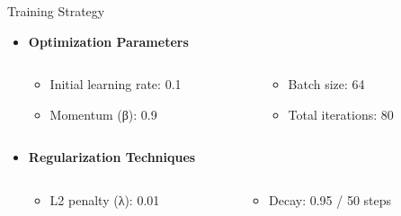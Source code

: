 \documentclass{beamer}
\begin{document}
\begin{frame}{Training Strategy}
    \begin{itemize}
        \item \textbf{Optimization Parameters}
            \begin{minipage}{\textwidth}
                \begin{columns}
                    \begin{column}{0.45\textwidth}
                        \begin{itemize}
                            \item Initial learning rate: 0.1
                            \item Momentum (β): 0.9
                        \end{itemize}
                    \end{column}
                    \begin{column}{0.45\textwidth}
                        \begin{itemize}
                            \item Batch size: 64
                            \item Total iterations: 80
                        \end{itemize}
                    \end{column}
                \end{columns}
            \end{minipage}
        \vspace{0.25cm}

        \item \textbf{Regularization Techniques}
            \begin{minipage}{\textwidth}
                \begin{columns}
                    \begin{column}{0.45\textwidth}
                        \begin{itemize}
                            \item L2 penalty (λ): 0.01
                        \end{itemize}
                    \end{column}
                    \begin{column}{0.45\textwidth}
                        \begin{itemize}
                            \item Decay: 0.95 / 50 steps
                        \end{itemize}
                    \end{column}
                \end{columns}
            \end{minipage}
        \vspace{0.25cm}


\end{itemize}
\end{frame}
\end{document}
